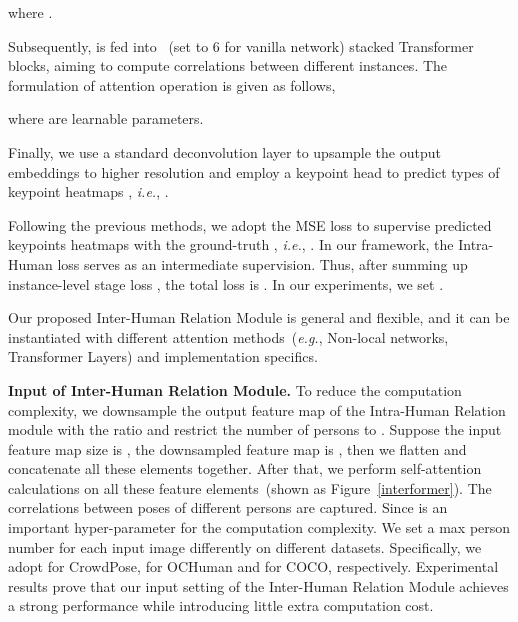 \documentclass{article}
\begin{document}
where . 

Subsequently,  is fed into ~(set to 6 for vanilla network) stacked Transformer blocks, aiming to compute correlations between different instances. The formulation of attention operation is given as follows, 
    

where  are learnable parameters.

Finally, we use a standard deconvolution layer to upsample the output embeddings   to higher resolution and employ a keypoint head to predict  types of keypoint heatmaps , \emph{i.e.}, .

Following the previous methods, we adopt the MSE loss to supervise predicted keypoints heatmaps  with the ground-truth , \emph{i.e.}, . In our framework, the Intra-Human loss  serves as an intermediate supervision. Thus, after summing up instance-level stage loss , the total loss is . In our experiments, we set .






Our proposed Inter-Human Relation Module is general and flexible, and it can be instantiated with different 
attention methods~(\emph{e.g.}, Non-local networks, Transformer Layers) and implementation specifics. 

\noindent\textbf{Input of Inter-Human Relation Module.}
To reduce the computation complexity, we downsample the output feature map of the Intra-Human Relation module with the ratio  and restrict the number of persons to . Suppose the input feature map size is , the downsampled feature map is , then we flatten and concatenate all these elements together. After that,  we perform self-attention calculations on all these feature elements~(shown as Figure~\ref{interformer}). The correlations between poses of different persons are captured. Since  is an important hyper-parameter for the computation complexity. We set a max person number  for each input image differently on different datasets. Specifically, we adopt  for CrowdPose,  for OCHuman and  for COCO, respectively. Experimental results prove that our input setting of the Inter-Human Relation Module achieves a strong performance while introducing little extra computation cost.
\end{document}
